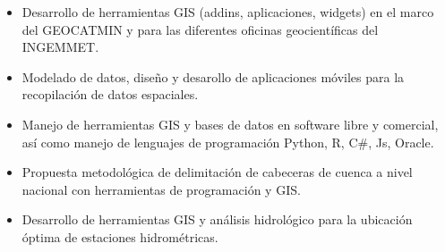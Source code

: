 \documentclass[10pt,a4paper,normalphoto]{altacv}
\begin{document}

\begin{fullwidth}
\makecvheader
\end{fullwidth}



\begin{itemize}
\item Desarrollo de herramientas GIS (addins, aplicaciones, widgets) en el marco del GEOCATMIN y para las diferentes oficinas geocientíficas del INGEMMET.
\item Modelado de datos, diseño y desarollo de aplicaciones móviles para la recopilación de datos espaciales.
\item Manejo de herramientas GIS y bases de datos en software libre y comercial, así como manejo de lenguajes de programación Python, R, C#, Js, Oracle.
\end{itemize}
\divider

\begin{itemize}
\item Propuesta metodológica de delimitación de cabeceras de cuenca a nivel nacional con herramientas de programación y GIS. 
\item Desarrollo de herramientas GIS y análisis hidrológico para la ubicación óptima de estaciones hidrométricas.
\end{itemize}
\divider
\end{document}
